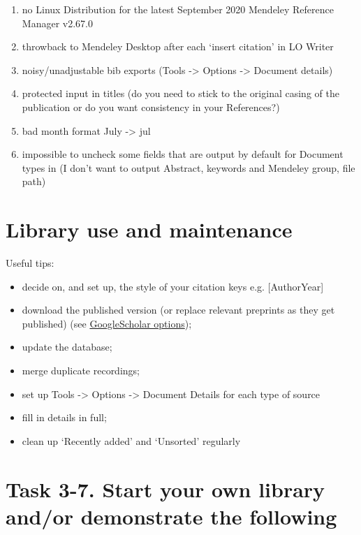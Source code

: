\documentclass[a4paper,11pt]{article}
\begin{document}
\begin{tcolorbox}[width=\textwidth, nobeforeafter,valign=center, fonttitle=\Large\bfseries,title=My current issues with Mendeley]
	\begin{enumerate}
		\item no Linux Distribution for the latest September 2020 Mendeley Reference Manager v2.67.0
		\item throwback to Mendeley Desktop after each `insert citation' in LO Writer
		\item noisy/unadjustable bib exports (Tools -> Options -> Document details)
		\item protected input in titles (do you need to stick to the original casing of the publication or do you want consistency in your References?)
		\item bad month format July -> jul
		\item impossible to uncheck some fields that are output by default for Document types in (I don't want to output Abstract, keywords and Mendeley group, file path)
	\end{enumerate}
\end{tcolorbox}

\section{Library use and maintenance}

Useful tips: 

\begin{itemize}
	\item decide on, and set up, the style of your citation keys e.g. [AuthorYear]
	\item download the published version (or replace relevant preprints as they get published) (see \href{https://scholar.google.com/scholar?hl=en\&as\_sdt=0\%2C5\&q=Controlling+Text+Complexity+in+Neural+Machine+Translation\&btnG=}{GoogleScholar options});
	\item update the database;
	\item merge duplicate recordings;
	\item set up Tools -> Options -> Document Details for each type of source
	\item fill in details in full;
	\item clean up `Recently added' and `Unsorted' regularly 
\end{itemize}


\section*{Task 3-7. Start your own library and/or demonstrate the following}
\label{task}
\end{document}
